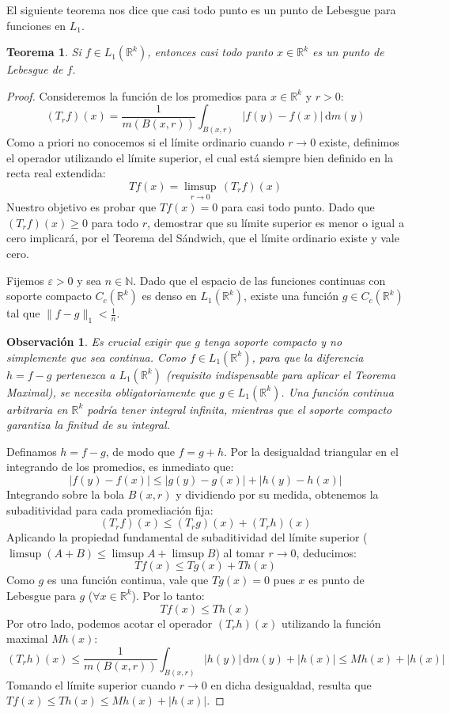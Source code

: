 \documentclass[12pt,a4paper]{article}
\theoremstyle{profesional}
\newtheorem{teorema}{Teorema}[section]
\theoremstyle{definicion-style}
\newtheorem{observacion}{Observación}[section]
\newcommand{\R}{\mathbb{R}}
\begin{document}
El siguiente teorema nos dice que casi todo punto es un punto de Lebesgue para funciones en \( L_1 \).

\begin{teorema}
    Si \( f \in L_1(\mathbb{R}^k) \), entonces casi todo punto \( x \in \mathbb{R}^k \) es un punto de Lebesgue de \( f \).
\end{teorema}
\begin{proof}
    Consideremos la función de los promedios para \( x \in \mathbb{R}^k \) y \( r > 0 \):
    \[
        (T_r f)(x) = \frac{1}{m(B(x,r))} \int_{B(x,r)} |f(y) - f(x)| \, \mathrm{d}m(y)
    \]
    Como a priori no conocemos si el límite ordinario cuando \( r \to 0 \) existe,
    definimos el operador utilizando el límite superior, el cual está siempre bien definido en la recta real extendida:
    \[
        Tf(x) = \limsup_{r \to 0} \, (T_r f)(x)
    \]
    Nuestro objetivo es probar que \(Tf(x) = 0\) para casi todo punto.
    Dado que \((T_r f)(x) \ge 0\) para todo \(r\), demostrar que su límite superior es menor o igual a cero implicará,
    por el Teorema del Sándwich, que el límite ordinario existe y vale cero.

    Fijemos \(\varepsilon > 0\) y sea \(n \in \mathbb{N}\).
    Dado que el espacio de las funciones continuas con soporte compacto \(C_c(\mathbb{R}^k)\) es denso en \(L_1(\mathbb{R}^k)\),
    existe una función \(g \in C_c(\mathbb{R}^k)\) tal que \( \|f - g\|_1 < \frac{1}{n}\).

    \begin{observacion}
        Es crucial exigir que \(g\) tenga soporte compacto y no simplemente que sea continua. Como \(f \in L_1(\mathbb{R}^k)\), para que la diferencia \(h = f - g\) pertenezca a \(L_1(\mathbb{R}^k)\) (requisito indispensable para aplicar el Teorema Maximal), se necesita obligatoriamente que \(g \in L_1(\mathbb{R}^k)\). Una función continua arbitraria en \(\mathbb{R}^k\) podría tener integral infinita, mientras que el soporte compacto garantiza la finitud de su integral.
    \end{observacion}

    Definamos \(h = f - g\), de modo que \(f = g + h\). Por la desigualdad triangular en el integrando de los promedios, es inmediato que:
    \[
        |f(y) - f(x)| \le |g(y) - g(x)| + |h(y) - h(x)|
    \]
    Integrando sobre la bola \(B(x,r)\) y dividiendo por su medida, obtenemos la subaditividad para cada promediación fija:
    \[
        (T_r f)(x) \le (T_r g)(x) + (T_r h)(x)
    \]
    Aplicando la propiedad fundamental de subaditividad del límite superior (\(\limsup(A+B) \le \limsup A + \limsup B\)) al tomar \(r \to 0\), deducimos:
    \[
        Tf(x) \le Tg(x) + Th(x)
    \]
    Como \(g\) es una función continua, vale que \(Tg(x) = 0\) pues \( x \) es punto de Lebesgue para \( g \) (\(\forall x \in \R^k \)). Por lo tanto:
    \[
        Tf(x) \le Th(x)
    \]
    Por otro lado, podemos acotar el operador \((T_r h)(x)\) utilizando la función maximal \(Mh(x)\):
    \[
        (T_r h)(x) \le \frac{1}{m(B(x,r))} \int_{B(x,r)} |h(y)| \, \mathrm{d}m(y) + |h(x)| \le Mh(x) + |h(x)|
    \]
    Tomando el límite superior cuando \(r \to 0\) en dicha desigualdad, resulta que \(Tf(x) \le Th(x) \le Mh(x) + |h(x)|\).


\end{proof}
\end{document}
